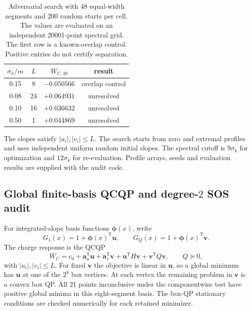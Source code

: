 \documentclass[12pt]{iopjournal}
\newenvironment{ruledtabular}{\centering}{}
\newcommand{\colrule}{\hline}
\begin{document}
\begin{table}[ht]
\caption{Adversarial search with 48 equal-width segments and 200 random starts per cell. The values are evaluated on an independent 20001-point spectral grid. The first row is a known-overlap control. Positive entries do not certify separation.}
\label{tab:highres-search}
\begin{ruledtabular}
\begin{tabular}{cccc}
$\sigma_k/m$ & $L$ & $\overline W_{C,48}$ & result \\
\colrule
0.15 & 8 & $-0.050566$ & overlap control \\
0.08 & 24 & $+0.064931$ & unresolved \\
0.10 & 16 & $+0.036632$ & unresolved \\
0.50 & 1 & $+0.044869$ & unresolved \\
\end{tabular}
\end{ruledtabular}
\end{table}

The slopes satisfy $|u_i|,|v_i|\le L$. The search starts from zero and extremal profiles and uses independent uniform random initial slopes. The spectral cutoff is $9\sigma_k$ for optimization and $12\sigma_k$ for re-evaluation. Profile arrays, seeds and evaluation results are supplied with the audit code.

\subsection{Global finite-basis QCQP and degree-$2$ SOS audit}

For integrated-slope basis functions $\bm\phi(x)$, write
\begin{equation}
G_1(x)=1+\bm\phi(x)^{\mathsf T}\bm u,
\qquad
G_Q(x)=1+\bm\phi(x)^{\mathsf T}\bm v.
\end{equation}
The charge response is the QCQP
\begin{equation}
\overline W_C=c_0+\bm a_u^{\mathsf T}\bm u
+\bm a_v^{\mathsf T}\bm v
+\bm u^{\mathsf T}H\bm v
+\bm v^{\mathsf T}Q\bm v,
\qquad Q\succeq0,
\end{equation}
with $|u_i|,|v_i|\le L$. For fixed $\bm v$ the objective is linear in $\bm u$, so a global minimum has $\bm u$ at one of the $2^8$ box vertices. At each vertex the remaining problem in $\bm v$ is a convex box QP. All 21 points inconclusive under the componentwise test have positive global minima in this eight-segment basis. The box-QP stationary conditions are checked numerically for each retained minimizer.
\end{document}

